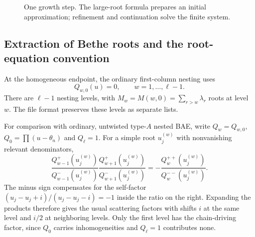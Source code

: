 \documentclass[11pt]{article}
\begin{document}
\begin{figure}[htbp]
\centering
{}
\caption{One growth step. The large-root formula prepares an initial
approximation; refinement and continuation solve the finite system.}
\label{fig:sequential}
\end{figure}

\subsection{Extraction of Bethe roots and the root-equation convention}
\label{sec:root-extraction}

At the homogeneous endpoint, the ordinary first-column nesting uses
\begin{equation}
 \label{eq:bethe-roots}
 Q_{w,0}(u)=0,\qquad w=1,\ldots,\ell-1.
\end{equation}
There are $\ell-1$ nesting levels, with
$M_w=M(w,0)=\sum_{r>w}\lambda_r$ roots at level $w$.
The file format preserves these levels as separate lists.

For comparison with ordinary, untwisted type-$A$ nested BAE, write
$Q_w=Q_{w,0}$, $Q_0=\prod(u-\theta_n)$ and $Q_\ell=1$.
For a simple root $u_j^{(w)}$ with nonvanishing relevant denominators,
\begin{equation}
 \label{eq:nested-bae}
 \frac{Q_{w-1}^{+}(u_j^{(w)})}{Q_{w-1}^{-}(u_j^{(w)})}
 \frac{Q_{w+1}^{+}(u_j^{(w)})}{Q_{w+1}^{-}(u_j^{(w)})}
 =-\frac{Q_w^{++}(u_j^{(w)})}{Q_w^{--}(u_j^{(w)})}.
\end{equation}
The minus sign compensates for the self-factor
$(u_j-u_j+i)/(u_j-u_j-i)=-1$ inside the ratio on the right.
Expanding the products therefore gives the usual scattering factors
with shifts $i$ at the same level and $i/2$ at neighboring levels.
Only the first level has the chain-driving factor, since $Q_0$ carries
inhomogeneities and $Q_\ell=1$ contributes none.
\end{document}
